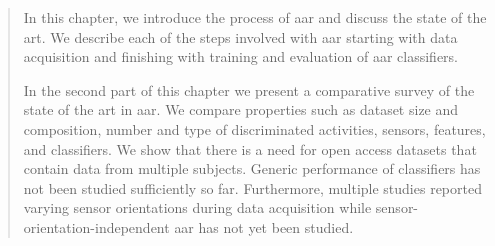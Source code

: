\begin{quote}



In this chapter, we introduce the process of \gls{aar} and discuss the state of the art.
We describe each of the steps involved with \gls{aar} starting with data acquisition and finishing with training and evaluation of \gls{aar} classifiers.

In the second part of this chapter we present a comparative survey of the state of the art in \gls{aar}.
We compare properties such as dataset size and composition, number and type of discriminated activities, sensors, features, and classifiers.
We show that there is a need for open access datasets that contain data from multiple subjects.
Generic performance of classifiers has not been studied sufficiently so far.
Furthermore, multiple studies reported varying sensor orientations during data acquisition while sensor-orientation-independent \gls{aar} has not yet been studied.




\end{quote}

